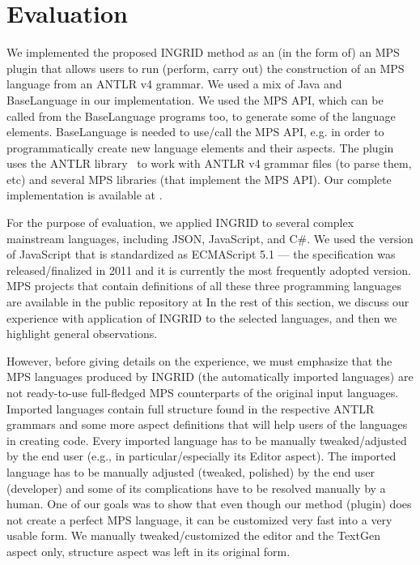 \section{Evaluation}
\label{sect:EVAL}






We implemented the proposed INGRID method as an (in the form of) an MPS plugin that allows users to run (perform, carry out) the construction of an MPS language from an ANTLR v4 grammar.
We used a mix of Java and BaseLanguage in our implementation.
We used the MPS API, which can be called from the BaseLanguage programs too, to generate some of the language elements.
BaseLanguage is needed to use/call the MPS API, e.g. in order to programmatically create new language elements and their aspects.
The plugin uses the ANTLR library~\cite{ref:ANTLR4} to work with ANTLR v4 grammar files (to parse them, etc) and several MPS libraries (that implement the MPS API).
Our complete implementation is available at .

For the purpose of evaluation, we applied INGRID to several complex mainstream languages, including JSON, JavaScript, and C\#.
We used the version of JavaScript that is standardized as ECMAScript 5.1 --- the specification was released/finalized in 2011 and it is currently the most frequently adopted version.
MPS projects that contain definitions of all these three programming languages are available in the public repository at 
In the rest of this section, we discuss our experience with application of INGRID to the selected languages, and then we highlight general observations.

However, before giving details on the experience, we must emphasize that the MPS languages produced by INGRID (the automatically imported languages) are not ready-to-use full-fledged MPS counterparts of the original input languages.
Imported languages contain full structure found in the respective ANTLR grammars and some more aspect definitions that will help users of the languages in creating code.
Every imported language has to be manually tweaked/adjusted by the end user (e.g., in particular/especially its Editor aspect).
The imported language has to be manually adjusted (tweaked, polished) by the end user (developer) and some of its complications have to be resolved manually by a human.
One of our goals was to show that even though our method (plugin) does not create a perfect MPS language, it can be customized very fast into a very usable form.
We manually tweaked/customized the editor and the TextGen aspect only, structure aspect was left in its original form.

